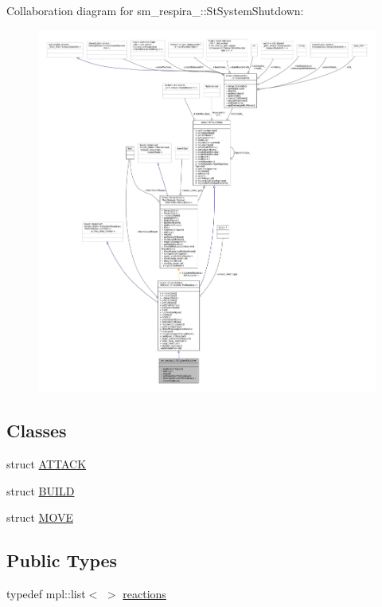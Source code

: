 Collaboration diagram for sm\+\_\+respira\+\_\+:\+:St\+System\+Shutdown\+:
\nopagebreak
\begin{figure}[H]
\begin{center}
\leavevmode
\includegraphics[width=350pt]{structsm__respira__1_1_1StSystemShutdown__coll__graph}
\end{center}
\end{figure}
\subsection*{Classes}
\begin{DoxyCompactItemize}
\item 
struct \hyperlink{structsm__respira__1_1_1StSystemShutdown_1_1ATTACK}{A\+T\+T\+A\+CK}
\item 
struct \hyperlink{structsm__respira__1_1_1StSystemShutdown_1_1BUILD}{B\+U\+I\+LD}
\item 
struct \hyperlink{structsm__respira__1_1_1StSystemShutdown_1_1MOVE}{M\+O\+VE}
\end{DoxyCompactItemize}
\subsection*{Public Types}
\begin{DoxyCompactItemize}
\item 
typedef mpl\+::list$<$  $>$ \hyperlink{structsm__respira__1_1_1StSystemShutdown_ae6fd4a2dbf4f3a8aa45f21074254a24e}{reactions}
\end{DoxyCompactItemize}
